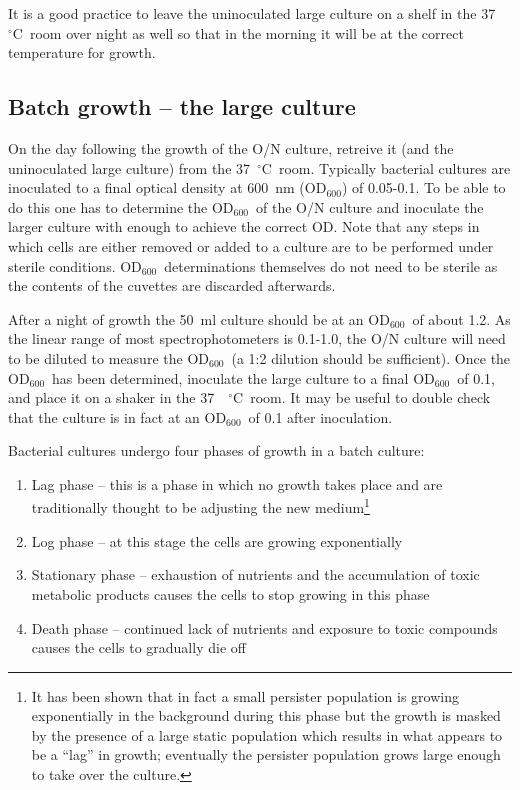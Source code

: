 \documentclass[a4paper]{article}
\newcommand{\dc}{~$^{\circ}$C}
\newcommand{\od}{OD$_{600}$}
\begin{document}
\begin{multicols}{2}
It is a good practice to leave the uninoculated large culture on a shelf in the
37~\dc\ room over night as well so that in the morning it will be at the
correct temperature for growth.


\subsection{Batch growth -- the large culture}

On the day following the growth of the O/N culture, retreive it (and the
uninoculated large culture) from the 37\dc\ room. Typically bacterial cultures
are inoculated to a final optical density at 600~nm (\od) of 0.05-0.1. To be
able to do this one has to determine the \od\ of the O/N culture and inoculate
the larger culture with enough to achieve the correct OD. Note that any steps
in which cells are either removed or added to a culture are to be performed
under sterile conditions. \od\ determinations themselves do not need to be
sterile as the contents of the cuvettes are discarded afterwards.

After a night of growth the 50~ml culture should be at an \od\ of about 1.2. As
the linear range of most spectrophotometers is 0.1-1.0, the O/N culture will
need to be diluted to measure the \od\ (a 1:2 dilution should be sufficient).
Once the \od\ has been determined, inoculate the large culture to a final \od\
of 0.1, and place it on a shaker in the 37~\dc\ room. It may be useful to
double check that the culture is in fact at an \od\ of 0.1 after inoculation.

Bacterial cultures undergo four phases of growth in a batch culture:\\
\begin{enumerate} \item Lag phase -- this is a phase in which no growth takes
place and are traditionally thought to be adjusting the new medium\footnote{It
has been shown that in fact a small persister population is growing
exponentially in the background during this phase but the growth is masked by
the presence of a large static population which results in what appears to be a
``lag'' in growth; eventually the persister population grows large enough to
take over the culture.} \item Log phase -- at this stage the cells are growing
exponentially \item Stationary phase -- exhaustion of nutrients and the
accumulation of toxic metabolic products causes the cells to stop growing in
this phase \item Death phase -- continued lack of nutrients and exposure to
toxic compounds causes the cells to gradually die off \end{enumerate}


\end{multicols}
\end{document}
